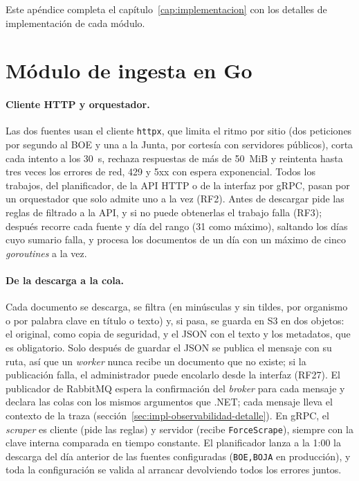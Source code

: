 \label{ap:implementacion}

Este apéndice completa el capítulo~\ref{cap:implementacion} con los detalles de implementación de cada módulo.

\section{Módulo de ingesta en Go}
\label{sec:impl-go-detalle}

\paragraph{Cliente HTTP y orquestador.} Las dos fuentes usan el cliente \texttt{httpx}, que limita el ritmo por sitio (dos peticiones por segundo al BOE y una a la Junta, por cortesía con servidores públicos), corta cada intento a los 30~s, rechaza respuestas de más de 50~MiB y reintenta hasta tres veces los errores de red, 429 y 5xx con espera exponencial. Todos los trabajos, del planificador, de la API HTTP o de la interfaz por gRPC, pasan por un orquestador que solo admite uno a la vez (RF2). Antes de descargar pide las reglas de filtrado a la API, y si no puede obtenerlas el trabajo falla (RF3); después recorre cada fuente y día del rango (31 como máximo), saltando los días cuyo sumario falla, y procesa los documentos de un día con un máximo de cinco \emph{goroutines} a la vez.

\paragraph{De la descarga a la cola.} Cada documento se descarga, se filtra (en minúsculas y sin tildes, por organismo o por palabra clave en título o texto) y, si pasa, se guarda en S3 en dos objetos: el original, como copia de seguridad, y el JSON con el texto y los metadatos, que es obligatorio. Solo después de guardar el JSON se publica el mensaje con su ruta, así que un \emph{worker} nunca recibe un documento que no existe; si la publicación falla, el administrador puede encolarlo desde la interfaz (RF27). El publicador de RabbitMQ \cite{rabbitmq} espera la confirmación del \emph{broker} para cada mensaje y declara las colas con los mismos argumentos que .NET; cada mensaje lleva el contexto de la traza (sección~\ref{sec:impl-observabilidad-detalle}). En gRPC, el \emph{scraper} es cliente (pide las reglas) y servidor (recibe \texttt{ForceScrape}), siempre con la clave interna comparada en tiempo constante. El planificador lanza a la 1:00 la descarga del día anterior de las fuentes configuradas (\texttt{BOE,BOJA} en producción), y toda la configuración se valida al arrancar devolviendo todos los errores juntos.

